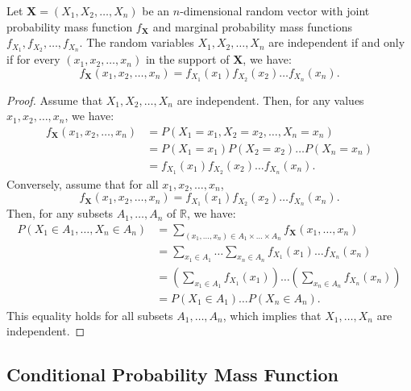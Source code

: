 \begin{proposition}
Let $\mathbf{X} = (X_{1}, X_{2}, \ldots, X_{n})$ be an $n$-dimensional random vector with joint probability mass function $f_{\mathbf{X}}$ and marginal probability mass functions $f_{X_{1}}, f_{X_{2}}, \ldots, f_{X_{n}}$. The random variables $X_{1}, X_{2}, \ldots, X_{n}$ are independent if and only if for every $(x_{1}, x_{2}, \ldots, x_{n})$ in the support of $\mathbf{X}$, we have:
\[
f_{\mathbf{X}}(x_{1}, x_{2}, \ldots, x_{n}) = f_{X_{1}}(x_{1}) f_{X_{2}}(x_{2}) \ldots f_{X_{n}}(x_{n}).
\]
\end{proposition}
\begin{proof}
Assume that $X_{1}, X_{2}, \ldots, X_{n}$ are independent. Then, for any values $x_{1}, x_{2}, \ldots, x_{n}$, we have:
\[
\begin{aligned}
f_{\mathbf{X}}(x_{1}, x_{2}, \ldots, x_{n}) &= P(X_{1} = x_{1}, X_{2} = x_{2}, \ldots, X_{n} = x_{n}) \\
&= P(X_{1} = x_{1}) P(X_{2} = x_{2}) \ldots P(X_{n} = x_{n}) \\
&= f_{X_{1}}(x_{1}) f_{X_{2}}(x_{2}) \ldots f_{X_{n}}(x_{n}).
\end{aligned}
\]
Conversely, assume that for all $x_{1}, x_{2}, \ldots, x_{n}$,
\[
f_{\mathbf{X}}(x_{1}, x_{2}, \ldots, x_{n}) = f_{X_{1}}(x_{1}) f_{X_{2}}(x_{2}) \ldots f_{X_{n}}(x_{n}).
\]
Then, for any subsets $A_{1}, \ldots, A_{n}$ of $\mathbb{R}$, we have:
\[
\begin{aligned}
P\left( X_{1} \in A_{1}, \ldots, X_{n} \in A_{n} \right) &= \sum_{(x_{1}, \ldots, x_{n}) \in A_{1} \times \ldots \times A_{n}} f_{\mathbf{X}}(x_{1}, \ldots, x_{n}) \\
&= \sum_{x_{1} \in A_{1}} \ldots \sum_{x_{n} \in A_{n}} f_{X_{1}}(x_{1}) \ldots f_{X_{n}}(x_{n}) \\
&= \left( \sum_{x_{1} \in A_{1}} f_{X_{1}}(x_{1}) \right) \ldots \left( \sum_{x_{n} \in A_{n}} f_{X_{n}}(x_{n}) \right) \\
&= P(X_{1} \in A_{1}) \ldots P(X_{n} \in A_{n}).
\end{aligned}
\]
This equality holds for all subsets $A_{1}, \ldots, A_{n}$, which implies that $X_{1}, \ldots, X_{n}$ are independent.
\end{proof}


\subsection{Conditional Probability Mass Function}

